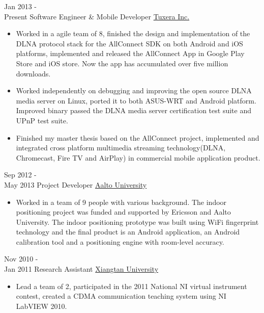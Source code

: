 \documentclass[letterpaper]{twentysecondcv} %
\begin{document}
\begin{twenty} %
	\twentyitem
    	{Jan 2013 - \\Present}
        {Software Engineer \& Mobile Developer}
        {\href{http://www.tuxera.com/}{Tuxera Inc.}}
        {}
        {
        {\begin{itemize}
        \item Worked in a agile team of 8, finished the design and implementation of the DLNA protocol stack for the AllConnect SDK on both Android and iOS platforms, implemented and released the AllConnect App in Google Play Store and iOS store. Now the app has accumulated over five million downloads.
        \item Worked independently on debugging and improving the open source DLNA media server on Linux, ported it to both ASUS-WRT and Android platform. Improved binary passed the DLNA media server certification test suite and UPnP test suite.
        \item Finished my master thesis based on the AllConnect project, implemented and integrated cross platform multimedia streaming technology(DLNA, Chromecast, Fire TV and AirPlay) in commercial mobile application product.
    \end{itemize}}
        }
        
    \twentyitem
   		{Sep 2012 - \\ May 2013}
        {Project Developer}
        {\href{http://www.aalto.fi/en/}{Aalto University}}
        {}
        {
        {\begin{itemize}
        \item Worked in a team of 9 people with various background. The indoor positioning project was funded and supported by Ericsson and Aalto University. The indoor positioning prototype was built using WiFi fingerprint technology and the final product is an Android application, an Android calibration tool and a positioning engine with room-level accuracy.
    \end{itemize}}
        }
        
     \twentyitem
   		{Nov 2010 - \\ Jan 2011}
        {Research Assistant}
        {\href{http://www.xtu.edu.cn/english/}{Xiangtan University}}
        {}
        {
        \begin{itemize}
        \item Lead a team of 2, participated in the 2011 National NI virtual instrument contest, created a CDMA communication teaching system using NI LabVIEW 2010.
    \end{itemize}
    	}
        
\end{twenty}
\end{document}
